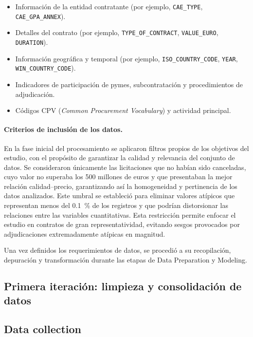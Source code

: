 \documentclass[a4paper,fleqn]{cas-sc}
\begin{document}
\begin{itemize}
	\item Información de la entidad contratante (por ejemplo, \texttt{CAE\_TYPE}, \texttt{CAE\_GPA\_ANNEX}).
	\item Detalles del contrato (por ejemplo, \texttt{TYPE\_OF\_CONTRACT}, \texttt{VALUE\_EURO}, \texttt{DURATION}).
	\item Información geográfica y temporal (por ejemplo, \texttt{ISO\_COUNTRY\_CODE}, \linebreak\texttt{YEAR}, \texttt{WIN\_COUNTRY\_CODE}).
	\item Indicadores de participación de pymes, subcontratación y procedimientos de adjudicación.
	\item Códigos CPV (\textit{Common Procurement Vocabulary}) y actividad principal.
\end{itemize}

\paragraph{Criterios de inclusión de los datos.}
	En la fase inicial del procesamiento se aplicaron filtros propios de los objetivos del estudio, con el propósito de garantizar la calidad y relevancia del conjunto de datos. 
Se consideraron únicamente las licitaciones que no habían sido canceladas, cuyo valor no superaba los 500 millones de euros y que presentaban la mejor relación calidad--precio, garantizando así la homogeneidad y pertinencia de los datos analizados.
	Este umbral se estableció para eliminar valores atípicos que representan menos del 0.1~\% de los registros y que podrían distorsionar las relaciones entre las variables cuantitativas.
Esta restricción permite enfocar el estudio en contratos de gran representatividad, evitando sesgos provocados por adjudicaciones extremadamente atípicas en magnitud.


Una vez definidos los requerimientos de datos, se procedió a su recopilación, depuración y transformación durante las etapas de Data Preparation y Modeling.

 
  
\subsection{Primera iteración: limpieza y consolidación de datos  }

\subsection*{\textbf{Data collection}}\label{sec:fase4-iteracion1}
\end{document}
